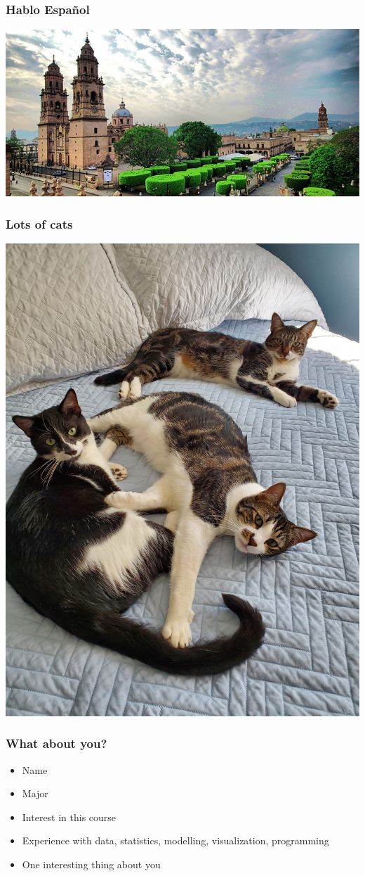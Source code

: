 \documentclass{beamer}
\begin{document}
\begin{frame}
\frametitle{Hablo Espa\~{n}ol}
\includegraphics[width=\textwidth]{morelia}
\end{frame}

\begin{frame}
\frametitle{Lots of cats}
\begin{center}
\includegraphics[height=\textheight]{cats}
\end{center}
\end{frame}

\begin{frame}
\frametitle{What about you?}
\begin{itemize}
\item Name
\item Major
\item Interest in this course
\item Experience with data, statistics, modelling, visualization, programming
\item One interesting thing about you
\end{itemize}
\end{frame}
\end{document}
